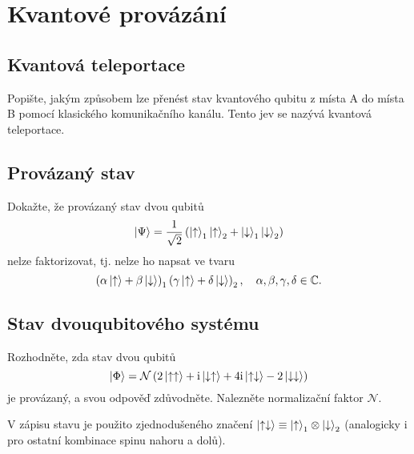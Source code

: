 \section{Kvantové provázání}
    \subsection{Kvantová teleportace}
        Popište, jakým způsobem lze přenést stav kvantového qubitu z místa A do místa B pomocí klasického komunikačního kanálu. Tento jev se nazývá kvantová teleportace.

    \subsection{Provázaný stav}
        Dokažte, že provázaný stav dvou qubitů 
        \begin{equation}
            \left|{\Psi}\right\rangle=\frac{1}{\sqrt{2}}\left(\left|{\uparrow}\right\rangle_{1}\left|{\uparrow}\right\rangle_{2}+\left|{\downarrow}\right\rangle_{1}\left|{\downarrow}\right\rangle_{2}\right)
        \end{equation}
        nelze faktorizovat, tj. nelze ho napsat ve tvaru
        \begin{equation}
            \left(\alpha\left|{\uparrow}\right\rangle+\beta\left|{\downarrow}\right\rangle\right)_{1}\left(\gamma\left|{\uparrow}\right\rangle+\delta\left|{\downarrow}\right\rangle\right)_{2},\quad\alpha,\beta,\gamma,\delta\in\mathbb{C}.
        \end{equation}

    \subsection{Stav dvouqubitového systému}
        Rozhodněte, zda stav dvou qubitů
        \begin{equation}
    \left|{\Phi}\right\rangle=\mathcal{N}\left(2\left|{\uparrow\uparrow}\right\rangle+\mathrm{i}\left|{\downarrow\uparrow}\right\rangle+4\mathrm{i}\left|{\uparrow\downarrow}\right\rangle-2\left|{\downarrow\downarrow}\right\rangle\right)
        \end{equation}
        je provázaný, a svou odpověď zdůvodněte. 
        Nalezněte normalizační faktor $\mathcal{N}$.

        V zápisu stavu je použito zjednodušeného značení $\left|{\uparrow\downarrow}\right\rangle\equiv\left|{\uparrow}\right\rangle_{1}\otimes\left|{\downarrow}\right\rangle_{2}$ (analogicky i pro ostatní kombinace spinu nahoru a dolů).
